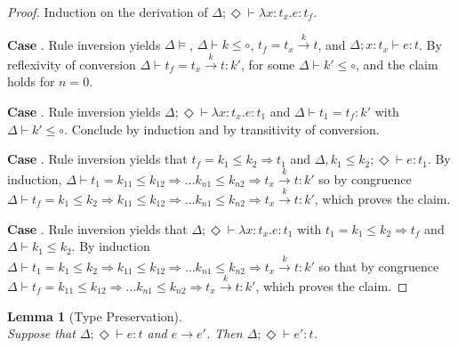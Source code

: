\documentclass{article}
\newcommand{\ONE}{\circ}
\newcommand{\TASS}[1]{#1\colon\!}
\newcommand{\LAM}[2]{\lambda\TASS{#1}#2.}
\newcommand{\KENV}{\Delta}
\newcommand{\TENVEMPTY}{\Diamond}
\newcommand\stepsto{\longrightarrow}
\newtheorem{lemma}{Lemma}
\begin{document}
\begin{proof}
  Induction on the derivation of
  $\KENV; \TENVEMPTY \vdash \LAM x {t_x} e : t_f$.

  \textbf{Case} . Rule inversion yields $\KENV \models$,
  $\KENV \vdash k \le \ONE$, $t_f = t_x \stackrel{k}\to t$, and
  $\KENV; \TASS x{t_x} \vdash e : t$. By reflexivity of conversion
  $\KENV \vdash t_f = t_x \stackrel{k}\to t : k'$, for some
  $\KENV \vdash k' \le \ONE$, and the claim holds for $n=0$.

  \textbf{Case} . Rule inversion yields
  $\KENV; \TENVEMPTY \vdash \LAM x {t_x} e : t_1$ and
  $\KENV \vdash t_1 = t_f : k'$ with $\KENV \vdash k' \le
  \ONE$. Conclude by induction and by transitivity of conversion.

  \textbf{Case} . Rule inversion yields that
  $t_f = k_1 \le k_2 \Rightarrow t_1$ and
  $\KENV, k_1 \le k_2; \TENVEMPTY \vdash e : t_1$. By induction,
  $\KENV \vdash t_1 = k_{11}\le k_{12}\Rightarrow \dots k_{n1}\le
  k_{n2} \Rightarrow t_x \stackrel{k}\to t : k'$ so by congruence
  $\KENV \vdash t_f = k_1 \le k_2 \Rightarrow k_{11}\le k_{12}\Rightarrow \dots k_{n1}\le
  k_{n2} \Rightarrow t_x \stackrel{k}\to t : k'$, which proves the claim.

  \textbf{Case} . Rule inversion yields that
  $\KENV; \TENVEMPTY \vdash \LAM x {t_x} e : t_1$ with
  $t_1 = k_1 \le k_2 \Rightarrow t_f$ and $\KENV \vdash k_1 \le
  k_2$. By induction
  $\KENV \vdash t_1 = k_1 \le k_2 \Rightarrow k_{11}\le
  k_{12}\Rightarrow \dots k_{n1}\le k_{n2} \Rightarrow t_x
  \stackrel{k}\to t : k'$ so that by congruence
  $\KENV \vdash t_f = k_{11}\le
  k_{12}\Rightarrow \dots k_{n1}\le k_{n2} \Rightarrow t_x
  \stackrel{k}\to t : k'$, which proves the claim.
\end{proof}
\begin{lemma}[Type Preservation]~\\
  Suppose that $\KENV; \TENVEMPTY \vdash e : t$ and $e \stepsto e'$.
  Then $\KENV;\TENVEMPTY \vdash e' : t$.
\end{lemma}
\end{document}
